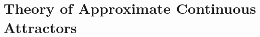 \documentclass{article} %
\newcounter{ct}
\theoremstyle{definition}
\theoremstyle{remark}
\begin{document}


\section{Theory of Approximate Continuous Attractors}\label{sec:theory}
\end{document}
